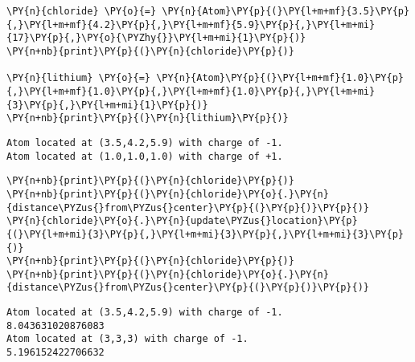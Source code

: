 \begin{tcolorbox}[breakable, size=fbox, boxrule=1pt, pad at break*=1mm,colback=cellbackground, colframe=cellborder]
\begin{Verbatim}[commandchars=\\\{\}]
\end{Verbatim}
\end{tcolorbox}

    \begin{tcolorbox}[breakable, size=fbox, boxrule=1pt, pad at break*=1mm,colback=cellbackground, colframe=cellborder]
\begin{Verbatim}[commandchars=\\\{\}]
\PY{n}{chloride} \PY{o}{=} \PY{n}{Atom}\PY{p}{(}\PY{l+m+mf}{3.5}\PY{p}{,}\PY{l+m+mf}{4.2}\PY{p}{,}\PY{l+m+mf}{5.9}\PY{p}{,}\PY{l+m+mi}{17}\PY{p}{,}\PY{o}{\PYZhy{}}\PY{l+m+mi}{1}\PY{p}{)}
\PY{n+nb}{print}\PY{p}{(}\PY{n}{chloride}\PY{p}{)}

\PY{n}{lithium} \PY{o}{=} \PY{n}{Atom}\PY{p}{(}\PY{l+m+mf}{1.0}\PY{p}{,}\PY{l+m+mf}{1.0}\PY{p}{,}\PY{l+m+mf}{1.0}\PY{p}{,}\PY{l+m+mi}{3}\PY{p}{,}\PY{l+m+mi}{1}\PY{p}{)}
\PY{n+nb}{print}\PY{p}{(}\PY{n}{lithium}\PY{p}{)}
\end{Verbatim}
\end{tcolorbox}

    \begin{Verbatim}[commandchars=\\\{\}]
Atom located at (3.5,4.2,5.9) with charge of -1.
Atom located at (1.0,1.0,1.0) with charge of +1.
    \end{Verbatim}

    \begin{tcolorbox}[breakable, size=fbox, boxrule=1pt, pad at break*=1mm,colback=cellbackground, colframe=cellborder]
\begin{Verbatim}[commandchars=\\\{\}]
\PY{n+nb}{print}\PY{p}{(}\PY{n}{chloride}\PY{p}{)}
\PY{n+nb}{print}\PY{p}{(}\PY{n}{chloride}\PY{o}{.}\PY{n}{distance\PYZus{}from\PYZus{}center}\PY{p}{(}\PY{p}{)}\PY{p}{)}
\PY{n}{chloride}\PY{o}{.}\PY{n}{update\PYZus{}location}\PY{p}{(}\PY{l+m+mi}{3}\PY{p}{,}\PY{l+m+mi}{3}\PY{p}{,}\PY{l+m+mi}{3}\PY{p}{)}
\PY{n+nb}{print}\PY{p}{(}\PY{n}{chloride}\PY{p}{)}
\PY{n+nb}{print}\PY{p}{(}\PY{n}{chloride}\PY{o}{.}\PY{n}{distance\PYZus{}from\PYZus{}center}\PY{p}{(}\PY{p}{)}\PY{p}{)}
\end{Verbatim}
\end{tcolorbox}

    \begin{Verbatim}[commandchars=\\\{\}]
Atom located at (3.5,4.2,5.9) with charge of -1.
8.043631020876083
Atom located at (3,3,3) with charge of -1.
5.196152422706632
    \end{Verbatim}

